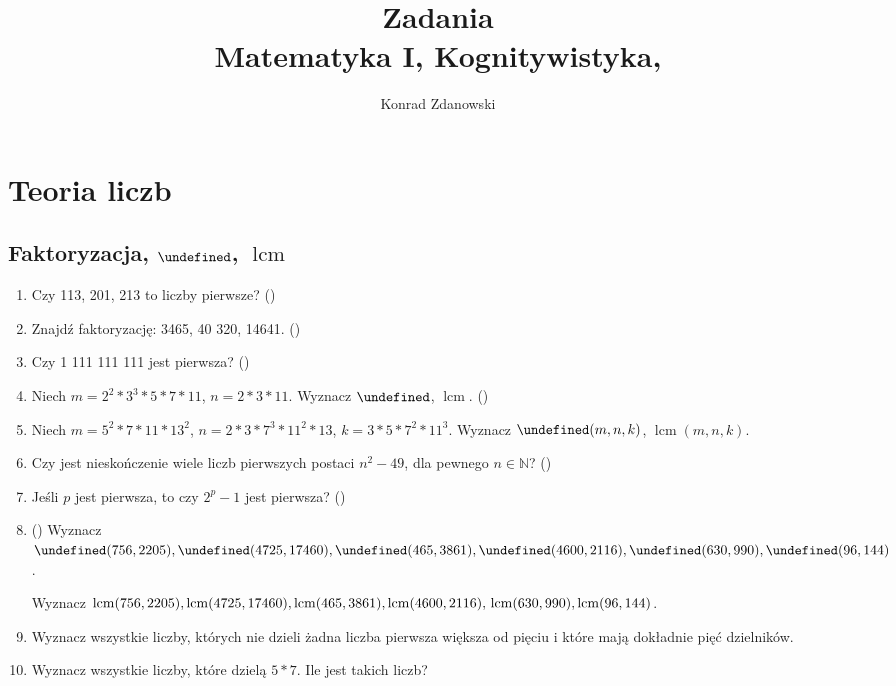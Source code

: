 \documentclass[12pt]{article}
\title{Zadania \\ Matematyka I, Kognitywistyka,}
\author{Konrad Zdanowski}
\let\gcd\undefined
\DeclareMathOperator{\gcd}{gcd}
\DeclareMathOperator{\lcm}{lcm}
\newcommand{\NN}{\mathbb{N}}
\begin{document}
\maketitle
\thispagestyle{empty}

\section{Teoria liczb}
\subsection{Faktoryzacja, $\gcd$, $\lcm$}
\begin{enumerate}
    \item Czy 113, 201, 213 to liczby pierwsze? 
        (\cite[4.6.3, zad. 2]{Forman.2015})
     \item Znajdź faktoryzację: 3465, 40 320, 14641.  (\cite{Forman.2015})	
\item  Czy 1 111 111 111 jest pierwsza? (\cite{Forman.2015})
\item Niech $m = 2^2*3^3 * 5 * 7* 11$,  $n = 2*3*11$.
   Wyznacz $\gcd$, $\lcm$. (\cite{Forman.2015})
\item Niech $m = 5^2*7*11*13^2$, $n = 2*3*7^3*11^2*13$,
            $k=3*5*7^2*11^3$.
   Wyznacz $\gcd(m,n,k)$, $\lcm(m,n,k)$. 
\item 
 Czy jest nieskończenie wiele liczb pierwszych postaci $n^2 - 49$,
 dla pewnego $n\in\NN$? (\cite{Forman.2015})
\item 
Jeśli $p$ jest pierwsza, to czy $2^p - 1$ jest pierwsza? (\cite{Forman.2015})
\item  (\cite{Forman.2015})
 Wyznacz
    $\gcd(756, 2205),
    \gcd(4725, 17460), 
    \gcd(465, 3861),
    \gcd(4600, 2116), \\
    \gcd(630, 990), 
    \gcd(96, 144)$.

Wyznacz
$\lcm(756, 2205),
\lcm(4725, 17460),
\lcm(465, 3861),
\lcm(4600, 2116),\\
\lcm(630, 990),
\lcm(96, 144)$.


\item Wyznacz wszystkie liczby, których nie dzieli
żadna liczba pierwsza większa od pięciu i które mają 
dokładnie pięć dzielników.

\item Wyznacz wszystkie liczby, które dzielą $5*7$. 
      Ile jest takich liczb?


\end{enumerate}
\end{document}
